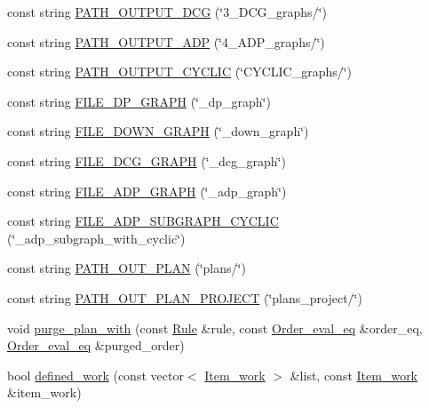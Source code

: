\begin{DoxyCompactItemize}
\item 
const string \hyperlink{namespacegenevalmag_a85c614ca01eca9ab0edd6bdf400259fd}{PATH\_\-OUTPUT\_\-DCG} (\char`\"{}3\_\-DCG\_\-graphs/\char`\"{})
\item 
const string \hyperlink{namespacegenevalmag_a609ccdf53fd8e4f1526ef4a396323d7d}{PATH\_\-OUTPUT\_\-ADP} (\char`\"{}4\_\-ADP\_\-graphs/\char`\"{})
\item 
const string \hyperlink{namespacegenevalmag_a401d9cc13c246072071c64015b3716c8}{PATH\_\-OUTPUT\_\-CYCLIC} (\char`\"{}CYCLIC\_\-graphs/\char`\"{})
\item 
const string \hyperlink{namespacegenevalmag_a705fcd9aaf32cd0052ad7909df8994ca}{FILE\_\-DP\_\-GRAPH} (\char`\"{}\_\-dp\_\-graph\char`\"{})
\item 
const string \hyperlink{namespacegenevalmag_abc175fb26b27cb9f1ec2b56cfc390bbe}{FILE\_\-DOWN\_\-GRAPH} (\char`\"{}\_\-down\_\-graph\char`\"{})
\item 
const string \hyperlink{namespacegenevalmag_a009f31ef1d07f4ca8786f9e2cc813279}{FILE\_\-DCG\_\-GRAPH} (\char`\"{}\_\-dcg\_\-graph\char`\"{})
\item 
const string \hyperlink{namespacegenevalmag_ac89f8e579ae12e809a074364a2aced0c}{FILE\_\-ADP\_\-GRAPH} (\char`\"{}\_\-adp\_\-graph\char`\"{})
\item 
const string \hyperlink{namespacegenevalmag_a418104f5a0e7464632745f28884c8017}{FILE\_\-ADP\_\-SUBGRAPH\_\-CYCLIC} (\char`\"{}\_\-adp\_\-subgraph\_\-with\_\-cyclic\char`\"{})
\item 
const string \hyperlink{namespacegenevalmag_a605c56dc4a9a367c9da7c7759c7f6b65}{PATH\_\-OUT\_\-PLAN} (\char`\"{}plans/\char`\"{})
\item 
const string \hyperlink{namespacegenevalmag_a345f3ac168618479f16dbd899562685e}{PATH\_\-OUT\_\-PLAN\_\-PROJECT} (\char`\"{}plans\_\-project/\char`\"{})
\item 
void \hyperlink{namespacegenevalmag_ace0b7e67565040ba64e1710d0029026b}{purge\_\-plan\_\-with} (const \hyperlink{classgenevalmag_1_1Rule}{Rule} \&rule, const \hyperlink{namespacegenevalmag_a0bb2e8b0fa1b07b873f0363719de7b64}{Order\_\-eval\_\-eq} \&order\_\-eq, \hyperlink{namespacegenevalmag_a0bb2e8b0fa1b07b873f0363719de7b64}{Order\_\-eval\_\-eq} \&purged\_\-order)
\item 
bool \hyperlink{namespacegenevalmag_ad89277e822c1a4d635c554e8c6698e76}{defined\_\-work} (const vector$<$ \hyperlink{structgenevalmag_1_1i__w}{Item\_\-work} $>$ \&list, const \hyperlink{structgenevalmag_1_1i__w}{Item\_\-work} \&item\_\-work)

\end{DoxyCompactItemize}
